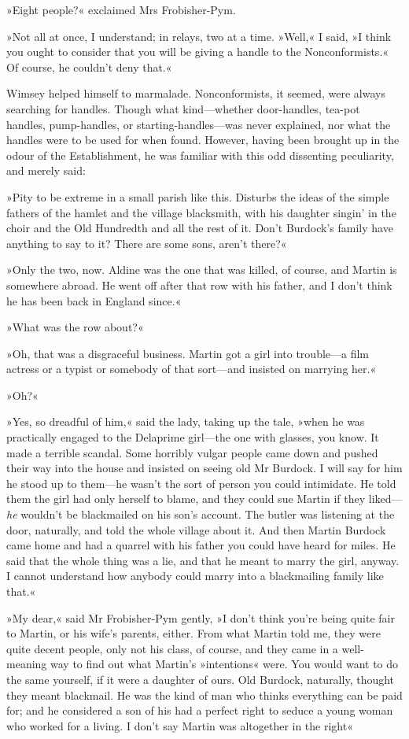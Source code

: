 »Eight people?« exclaimed Mrs Frobisher-Pym.

»Not all at once, I understand; in relays, two at a time. »Well,« I said, »I think you ought to consider that you will be giving a handle to the Nonconformists.« Of course, he couldn't deny that.«

Wimsey helped himself to marmalade. Nonconformists, it seemed, were always searching for handles. Though what kind—whether door-handles, tea-pot handles, pump-handles, or starting-handles—was never explained, nor what the handles were to be used for when found. However, having been brought up in the odour of the Establishment, he was familiar with this odd dissenting peculiarity, and merely said:

»Pity to be extreme in a small parish like this. Disturbs the ideas of the simple fathers of the hamlet and the village blacksmith, with his daughter singin' in the choir and the Old Hundredth and all the rest of it. Don't Burdock's family have anything to say to it? There are some sons, aren't there?«

»Only the two, now. Aldine was the one that was killed, of course, and Martin is somewhere abroad. He went off after that row with his father, and I don't think he has been back in England since.«

»What was the row about?«

»Oh, that was a disgraceful business. Martin got a girl into trouble—a film actress or a typist or somebody of that sort—and insisted on marrying her.«

»Oh?«

»Yes, so dreadful of him,« said the lady, taking up the tale, »when he was practically engaged to the Delaprime girl—the one with glasses, you know. It made a terrible scandal. Some horribly vulgar people came down and pushed their way into the house and insisted on seeing old Mr Burdock. I will say for him he stood up to them—he wasn't the sort of person you could intimidate. He told them the girl had only herself to blame, and they could sue Martin if they liked—\textit{he} wouldn't be blackmailed on his son's account. The butler was listening at the door, naturally, and told the whole village about it. And then Martin Burdock came home and had a quarrel with his father you could have heard for miles. He said that the whole thing was a lie, and that he meant to marry the girl, anyway. I cannot understand how anybody could marry into a blackmailing family like that.«

»My dear,« said Mr Frobisher-Pym gently, »I don't think you're being quite fair to Martin, or his wife's parents, either. From what Martin told me, they were quite decent people, only not his class, of course, and they came in a well-meaning way to find out what Martin's »intentions« were. You would want to do the same yourself, if it were a daughter of ours. Old Burdock, naturally, thought they meant blackmail. He was the kind of man who thinks everything can be paid for; and he considered a son of his had a perfect right to seduce a young woman who worked for a living. I don't say Martin was altogether in the right\longdash«

